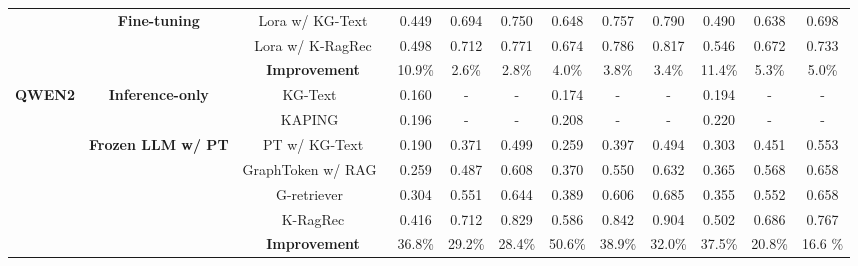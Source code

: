 \begin{table}[t]
{\begin{adjustbox}{}
\begin{tabular}{c|c|c|c|c|c|c|c|c|c|c|c}
    \cmidrule{2-12}
    &\multirow{3}{*}{\textbf{Fine-tuning}} &Lora w/ KG-Text& 0.449  & 0.694  &0.750 &\colorbox{backblue!75}{0.648}  &0.757 &0.790   &0.490   &0.638   & 0.698 \\
     & & Lora w/ K-RagRec &  \colorbox{backred!50} {0.498} & \colorbox{backred!50} {0.712}  & \colorbox{backred!50} {0.771} & \colorbox{backred!50} {0.674}  & \colorbox{backred!50} {0.786} & \colorbox{backred!50} {0.817}  & \colorbox{backred!50} {0.546}   & \colorbox{backred!50} {0.672}   & \colorbox{backred!50} {0.733}  \\
    \cmidrule{3-12}
    && \cellcolor{verylightgray} \textbf{Improvement} &   \cellcolor{verylightgray}10.9\%  & \cellcolor{verylightgray}2.6\% & \cellcolor{verylightgray}2.8\%  & \cellcolor{verylightgray}4.0\% &  \cellcolor{verylightgray}3.8\% &  \cellcolor{verylightgray}3.4\%  &  \cellcolor{verylightgray}11.4\%  & \cellcolor{verylightgray}5.3\%   &   \cellcolor{verylightgray}5.0\%      \\
   \midrule
    \multirow{10}{*}{\textbf{QWEN2}}&   \multirow{2}{*}{\textbf{Inference-only}} & KG-Text~\citep{wu2023retrieve}&0.160   & - & -  & 0.174 &  - &  -  &  0.194  &  -  &  - \\
    & &KAPING~\citep{baek2023knowledge}& 0.196  & - & -  & 0.208 &  - &  -  &  0.220  &  -  &  - \\
    \cmidrule{2-12}
    &\multirow{5}{*}{\textbf{Frozen LLM w/ PT}} &PT w/ KG-Text& 0.190 &  0.371 & 0.499 &0.259  &0.397 &0.494   &0.303   &0.451   &0.553   \\
    & &GraphToken w/ RAG~\citep{perozzi2024let} & 0.259	& 0.487	& 0.608  & 0.370 &0.550 &0.632   & 0.365  &0.568   &  0.658  \\
    & &G-retriever~\citep{he2024g} & 0.304	&0.551	&0.644  &0.389  &0.606 &0.685   &0.355   &0.552   &0.658 \\
     & & K-RagRec &   \colorbox{backblue!75}{0.416}	&\colorbox{backblue!75}{0.712}	&\colorbox{backblue!75}{0.829}  &0.586  &\colorbox{backblue!75}{0.842}  &0.904   & \colorbox{backblue!75}{0.502}  & \colorbox{backblue!75}{0.686} &  \colorbox{backblue!75}{0.767} \\
         \cmidrule{3-12}
    && \cellcolor{verylightgray} \textbf{Improvement} &   \cellcolor{verylightgray}36.8\%  & \cellcolor{verylightgray}29.2\% & \cellcolor{verylightgray}28.4\%  & \cellcolor{verylightgray}50.6\% &  \cellcolor{verylightgray}38.9\% &  \cellcolor{verylightgray}32.0\%  &  \cellcolor{verylightgray}37.5\%  & \cellcolor{verylightgray}20.8\%   &  \cellcolor{verylightgray}16.6 \%      \\

\end{tabular}
\end{adjustbox}}
\end{table}
